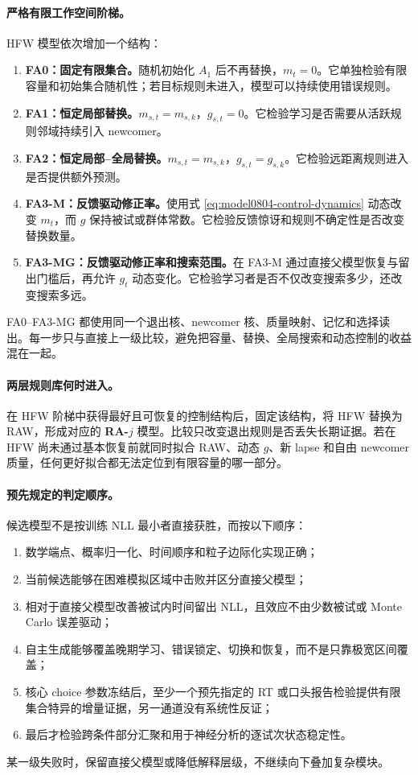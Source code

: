 \paragraph{严格有限工作空间阶梯。}
HFW 模型依次增加一个结构：
\begin{enumerate}
    \item \textbf{FA0：固定有限集合。}随机初始化 $A_1$ 后不再替换，$m_t=0$。它单独检验有限容量和初始集合随机性；若目标规则未进入，模型可以持续使用错误规则。
    \item \textbf{FA1：恒定局部替换。}$m_{s,t}=m_{s,k}$，$g_{s,t}=0$。它检验学习是否需要从活跃规则邻域持续引入 newcomer。
    \item \textbf{FA2：恒定局部--全局替换。}$m_{s,t}=m_{s,k}$，$g_{s,t}=g_{s,k}$。它检验远距离规则进入是否提供额外预测。
    \item \textbf{FA3-M：反馈驱动修正率。}使用式 \ref{eq:model0804-control-dynamics} 动态改变 $m_t$，而 $g$ 保持被试或群体常数。它检验反馈惊讶和规则不确定性是否改变替换数量。
    \item \textbf{FA3-MG：反馈驱动修正率和搜索范围。}在 FA3-M 通过直接父模型恢复与留出门槛后，再允许 $g_t$ 动态变化。它检验学习者是否不仅改变搜索多少，还改变搜索多远。
\end{enumerate}
FA0--FA3-MG 都使用同一个退出核、newcomer 核、质量映射、记忆和选择读出。每一步只与直接上一级比较，避免把容量、替换、全局搜索和动态控制的收益混在一起。

\paragraph{两层规则库何时进入。}
在 HFW 阶梯中获得最好且可恢复的控制结构后，固定该结构，将 HFW 替换为 RAW，形成对应的 \textbf{RA-$j$} 模型。比较只改变退出规则是否丢失长期证据。若在 HFW 尚未通过基本恢复前就同时拟合 RAW、动态 $g$、新 lapse 和自由 newcomer 质量，任何更好拟合都无法定位到有限容量的哪一部分。

\paragraph{预先规定的判定顺序。}
候选模型不是按训练 NLL 最小者直接获胜，而按以下顺序：
\begin{enumerate}
    \item 数学端点、概率归一化、时间顺序和粒子边际化实现正确；
    \item 当前候选能够在困难模拟区域中击败并区分直接父模型；
    \item 相对于直接父模型改善被试内时间留出 NLL，且效应不由少数被试或 Monte Carlo 误差驱动；
    \item 自主生成能够覆盖晚期学习、错误锁定、切换和恢复，而不是只靠极宽区间覆盖；
    \item 核心 choice 参数冻结后，至少一个预先指定的 RT 或口头报告检验提供有限集合特异的增量证据，另一通道没有系统性反证；
    \item 最后才检验跨条件部分汇聚和用于神经分析的逐试次状态稳定性。
\end{enumerate}
某一级失败时，保留直接父模型或降低解释层级，不继续向下叠加复杂模块。


